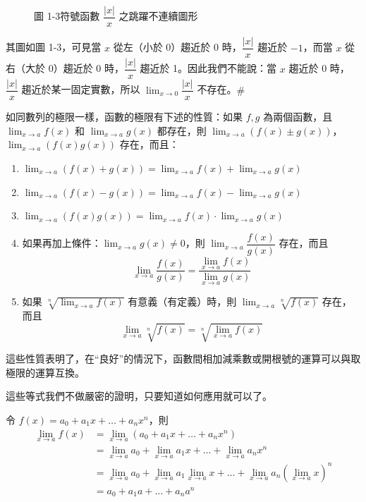 \begin{figure}[H]
\centering
{}
\caption{圖 1-3\quad 符號函數 $\dfrac{|x|}{x}$ 之跳躍不連續圖形}
\label{fig:b6s-app4-signum}
\end{figure}

其圖如圖 1-3，可見當 $x$ 從左（小於 0）趨近於 0 時，$\dfrac{|x|}{x}$ 趨近於 $-1$，而當 $x$ 從右（大於 0）趨近於 0 時，$\dfrac{|x|}{x}$ 趨近於 1。因此我們不能說：當 $x$ 趨近於 0 時，$\dfrac{|x|}{x}$ 趨近於某一固定實數，所以 $\lim_{x\to 0}\dfrac{|x|}{x}$ 不存在。\hfill$\#$

如同數列的極限一樣，函數的極限有下述的性質：如果 $f, g$ 為兩個函數，且 $\lim_{x\to a} f(x)$ 和 $\lim_{x\to a} g(x)$ 都存在，則 $\lim_{x\to a}(f(x)\pm g(x))$，$\lim_{x\to a}(f(x)g(x))$ 存在，而且：
\begin{enumerate}[label=\Roman*., leftmargin=2em]
  \item $\lim_{x\to a}(f(x)+g(x)) = \lim_{x\to a}f(x) + \lim_{x\to a}g(x)$
  \item $\lim_{x\to a}(f(x)-g(x)) = \lim_{x\to a}f(x) - \lim_{x\to a}g(x)$
  \item $\lim_{x\to a}(f(x)g(x)) = \lim_{x\to a}f(x) \cdot \lim_{x\to a}g(x)$
  \item 如果再加上條件：$\lim_{x\to a}g(x)\ne 0$，則 $\lim_{x\to a}\dfrac{f(x)}{g(x)}$ 存在，而且
  \[ \lim_{x\to a}\dfrac{f(x)}{g(x)} = \dfrac{\lim_{x\to a}f(x)}{\lim_{x\to a}g(x)} \]
  \item 如果 $\sqrt[n]{\lim_{x\to a}f(x)}$ 有意義（有定義）時，則 $\lim_{x\to a}\sqrt[n]{f(x)}$ 存在，而且
  \[ \lim_{x\to a}\sqrt[n]{f(x)} = \sqrt[n]{\lim_{x\to a}f(x)} \]
\end{enumerate}

這些性質表明了，在“良好”的情況下，函數間相加減乘數或開根號的運算可以與取極限的運算互換。

這些等式我們不做嚴密的證明，只要知道如何應用就可以了。

\begin{discussion}\label{ex:b6s-app4-disc1}\label{disc:b6s-app4-1}
令 $f(x) = a_0 + a_1 x + \dots + a_n x^n$，則
\begin{align*}
\lim_{x\to a} f(x) &= \lim_{x\to a}(a_0 + a_1 x + \dots + a_n x^n) \\
&= \lim_{x\to a}a_0 + \lim_{x\to a}a_1 x + \dots + \lim_{x\to a}a_n x^n \\
&= \lim_{x\to a}a_0 + \lim_{x\to a}a_1\lim_{x\to a}x + \dots + \lim_{x\to a}a_n\left(\lim_{x\to a}x\right)^n \\
&= a_0 + a_1 a + \dots + a_n a^n
\end{align*}
\end{discussion}


